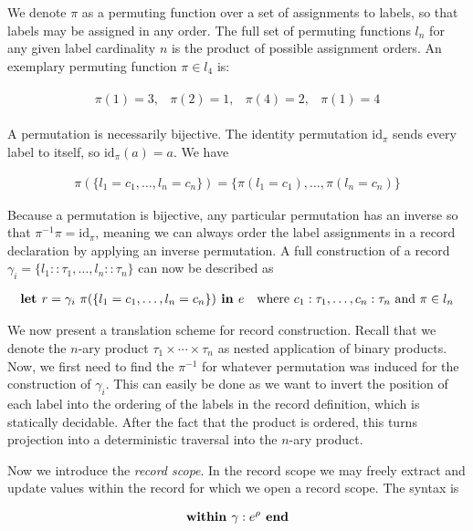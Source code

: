 We denote $\pi$ as a permuting function over a set of assignments to labels, so
that labels may be assigned in any order. The full set of permuting functions
$l_n$ for any given label cardinality $n$ is the product of possible assignment
orders. An exemplary permuting function $\pi \in l_4$ is:

\begin{align*}
  \begin{array}{llll}
    \pi(1) = 3, & \pi(2) = 1, & \pi(4) = 2, & \pi(1) = 4
  \end{array}
\end{align*}

A permutation is necessarily bijective. The identity permutation
$\text{id}_\pi$ sends every label to itself, so $\text{id}_\pi (a) = a$. We
have

\begin{align*}
  \pi(\{ l_1 = c_1, \dots, l_n = c_n \})
    = \{ \pi(l_1 = c_1), \dots, \pi(l_n = c_n) \}
\end{align*}

Because a permutation is bijective, any particular permutation has an inverse
so that $\pi^{-1} \pi = \text{id}_\pi$, meaning we can always order the label
assignments in a record declaration by applying an inverse permutation. A full
construction of a record $\gamma_i = \{ l_1 :: \tau_1, \dots, l_n :: \tau_n \}$
can now be described as

\begin{align*}
  &\textbf{let } r = \gamma_i~\pi(\{ l_1 = c_1, \dots, l_n = c_n \}) \textbf{ in } e
  & \text{where } c_1 : \tau_1, \dots, c_n : \tau_n \text{ and } \pi \in l_n
\end{align*}

We now present a translation scheme for record construction. Recall that we
denote the $n$-ary product $\tau_1 \times \cdots \times \tau_n$ as nested
application of binary products. Now, we first need to find the $\pi^{-1}$ for
whatever permutation was induced for the construction of $\gamma_i$. This can
easily be done as we want to invert the position of each label into the
ordering of the labels in the record definition, which is statically decidable.
After the fact that the product is ordered, this turns projection into a
deterministic traversal into the $n$-ary product.

Now we introduce the \emph{record scope}. In the record scope we may freely
extract and update values within the record for which we open a record scope.
The syntax is

\begin{align*}
  \textbf{within } \gamma : e^\rho \textbf{ end}
\end{align*}

